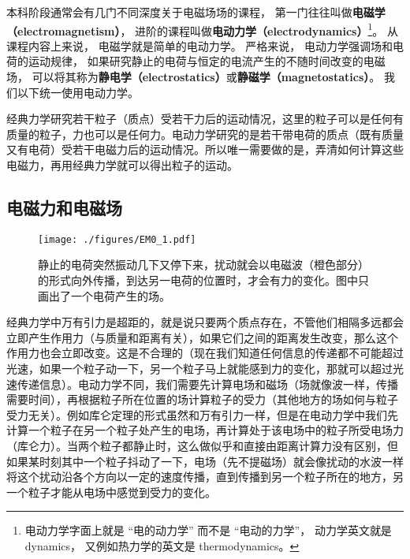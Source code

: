 
\begin{issues}
\issueTODO
\end{issues}


本科阶段通常会有几门不同深度关于电磁场场的课程， 第一门往往叫做\textbf{电磁学（electromagnetism）}， 进阶的课程叫做\textbf{电动力学（electrodynamics）}\footnote{电动力学字面上就是 “电的动力学” 而不是 “电动的力学”， 动力学英文就是 dynamics， 又例如热力学的英文是 thermodynamics。}。 从课程内容上来说， 电磁学就是简单的电动力学。 严格来说， 电动力学强调场和电荷的运动规律， 如果研究静止的电荷与恒定的电流产生的不随时间改变的电磁场， 可以将其称为\textbf{静电学（electrostatics）}或\textbf{静磁学（magnetostatics）}。 我们以下统一使用电动力学。

经典力学研究若干粒子（质点）受若干力后的运动情况，这里的粒子可以是任何有质量的粒子，力也可以是任何力。电动力学研究的是若干带电荷的质点（既有质量又有电荷）受若干电磁力后的运动情况。所以唯一需要做的是，弄清如何计算这些电磁力，再用经典力学就可以得出粒子的运动。

\subsection{电磁力和电磁场}

\begin{figure}[ht]
\centering
\texttt{[image: ./figures/EM0\_1.pdf]}
\caption{静止的电荷突然振动几下又停下来，扰动就会以电磁波（橙色部分）的形式向外传播，到达另一电荷的位置时，才会有力的变化。图中只画出了一个电荷产生的场。} \label{EM0_fig1}
\end{figure}

经典力学中万有引力是超距的，就是说只要两个质点存在，不管他们相隔多远都会立即产生作用力（与质量和距离有关），如果它们之间的距离发生改变，那么这个作用力也会立即改变。这是不合理的（现在我们知道任何信息的传递都不可能超过光速，如果一个粒子动一下，另一个粒子马上就能感到力的变化，那就可以超过光速传递信息）。电动力学不同，我们需要先计算电场和磁场（场就像波一样，传播需要时间），再根据粒子所在位置的场计算粒子的受力（其他地方的场如何与粒子受力无关）。例如库仑定理的形式虽然和万有引力一样，但是在电动力学中我们先计算一个粒子在另一个粒子处产生的电场，再计算处于该电场中的粒子所受电场力（库仑力）。当两个粒子都静止时，这么做似乎和直接由距离计算力没有区别，但如果某时刻其中一个粒子抖动了一下，电场（先不提磁场）就会像扰动的水波一样将这个扰动沿各个方向以一定的速度传播，直到传播到另一个粒子所在的地方，另一个粒子才能从电场中感觉到受力的变化。

